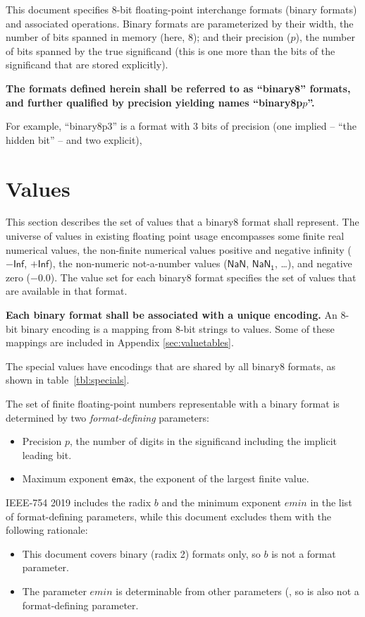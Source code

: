 \documentclass{article}
\def\parameter#1{\ensuremath{\mathsf{#1}}\xspace}
\def\emax{\parameter{emax}}
\def\val#1{$\mathsf{#1}$}
\newcommand{\spec}[1]{{\bf #1}}
\begin{document}
This document specifies 8-bit floating-point interchange formats (binary formats) and associated operations.
Binary formats are parameterized by their width, the number of bits spanned in memory (here, 8); and their precision ($p$), the number of bits spanned by the true significand (this is one more than the bits of the significand that are stored explicitly).

\spec{
The formats defined herein shall be referred to as ``binary8'' formats, and further qualified by precision yielding names ``binary8p$p$''.
}

For example, ``binary8p3'' is a format with 3 bits of precision (one implied – “the hidden bit” – and two explicit),

\clearpage
\section{Values}
\label{sec:values}

This section describes the set of values that a binary8 format shall represent.
The universe of values in existing floating point usage encompasses some finite real numerical values,
the non-finite numerical values positive and negative infinity (\val{-Inf}, \val{+Inf}),
the non-numeric not-a-number values (\val{NaN}, \val{NaN_1}, …),
and negative zero ($-0.0$).
The value set for each binary8 format specifies the set of values that are available in that format. 

\spec{Each binary format shall be associated with a unique encoding.}
An 8-bit binary encoding is a mapping from 8-bit strings to values. Some of these mappings are included in Appendix \ref{sec:valuetables}.  

The special values have encodings that are shared by all binary8 formats, as shown in table~\ref{tbl:specials}.

The set of finite floating-point numbers representable with a binary format is determined by two {\em format-defining} parameters:
\begin{itemize}
\item Precision $p$, the number of digits in the significand including the implicit leading bit.
\item Maximum exponent \emax, the exponent of the largest finite value.
\end{itemize}
IEEE-754 2019 includes the radix $b$ and the minimum exponent $\mathit{emin}$ in the list of format-defining parameters, while this document excludes them with the following rationale:
\begin{itemize}
    \item This document covers binary (radix 2) formats only, so $b$ is not a format parameter.
    \item The parameter $\mathit{emin}$ is determinable from other parameters (, so is also not a format-defining parameter.
\end{itemize}
\end{document}
